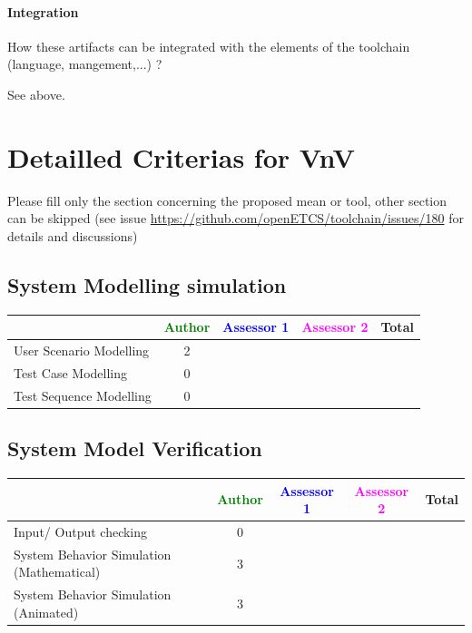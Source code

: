 \paragraph{Integration}
    How these artifacts can be integrated with the elements of the toolchain (language, mangement,...) ?

\begin{author_comment}
   See above.
\end{author_comment}

\section{Detailled Criterias for VnV}

Please  fill only the section concerning the proposed mean or tool, other section can be skipped (see issue \url{https://github.com/openETCS/toolchain/issues/180} for details and discussions)



\subsection{System Modelling simulation}	

\begin{tabular}{|l | c | c | c | c|}
\hline
& \textcolor{green}{Author} & \textcolor{blue}{Assessor 1} & \textcolor{magenta}{Assessor 2} & Total \\
\hline 
User Scenario Modelling & 2& & &  \\
\hline
Test Case Modelling & 0& & &  \\
\hline
Test Sequence Modelling & 0& & &  \\
\hline
\end{tabular}
	
\subsection{System Model Verification}	


\begin{tabular}{|l | c | c | c | c|}
\hline
& \textcolor{green}{Author} & \textcolor{blue}{Assessor 1} & \textcolor{magenta}{Assessor 2} & Total \\
\hline 
Input/ Output checking &0 & & &  \\
\hline
System Behavior Simulation (Mathematical) & 3& & &  \\
\hline
System Behavior Simulation (Animated) &3 & & &  \\
\hline
\end{tabular}


